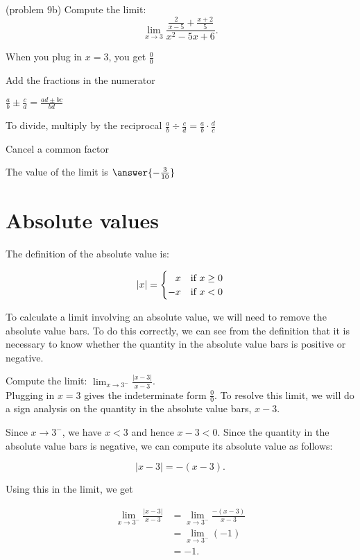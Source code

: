 \documentclass[handout]{ximera}
\begin{document}
\begin{problem}(problem 9b)
  Compute the limit:
  \[
    \lim_{x \to 3} \frac{\frac{2}{x-5} + \frac{x+2}{5}}{x^2 - 5x + 6}.
  \]
  
    \begin{hint}
      When you plug in $x = 3$, you get $\frac00$
    \end{hint}
    \begin{hint}
      Add the fractions in the numerator
    \end{hint}
    \begin{hint}
      $\frac{a}{b} \pm \frac{c}{d} = \frac{ad \pm bc}{bd}$
    \end{hint}
    \begin{hint}
      To divide, multiply by the reciprocal $\frac{a}{b} \div \frac{c}{d} = \frac{a}{b} \cdot \frac{d}{c}$ 
    \end{hint}
    \begin{hint}
      Cancel a common factor
    \end{hint}
		The value of the limit is
		 $\answer{-\frac{3}{10}}$
		
\end{problem}




\section{Absolute values}


The definition of the absolute value is:

\[
\left | x \right | = 
\begin{cases}
\hfill x & \text{if $x\geq 0$}\\         -x & \text{if $x<0$}
\end{cases}
\] 

To calculate a limit involving an absolute value, we will need to remove the absolute value bars. 
To do this correctly, we can see from the definition that it is necessary to know whether the 
quantity in the absolute value bars is positive or negative.


\begin{example}[example 10]
Compute the limit: $\displaystyle{\lim_{x \to 3^{-}} \frac{|x-3|}{x-3}}$.\\
Plugging in $x = 3$ gives the indeterminate form $\frac00$. To resolve this limit, 
we will do a sign analysis on the quantity in the absolute value bars, $x-3$.

Since $x \to 3^-$, we have $x<3$ and hence $x-3 <0$. Since the quantity in the absolute value bars is negative, 
we can compute its absolute value as follows:

\[|x-3| = -(x-3).\]

Using this in the limit, we get

\begin{align*}
\lim_{x \to 3^-} \frac{|x-3|}{x-3} &= \lim_{x \to 3^-} \frac{-(x-3)}{x-3} \\[.4 em]
&= \lim_{x \to 3^-} (-1) \\
&= -1.
\end{align*}
\end{example}
\end{document}

